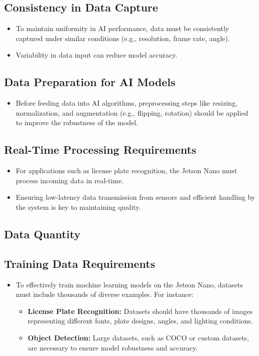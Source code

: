 \subsection*{Consistency in Data Capture}
\begin{itemize}[leftmargin=1.5cm]
	\item To maintain uniformity in AI performance, data must be consistently captured under similar conditions (e.g., resolution, frame rate, angle).
	\item Variability in data input can reduce model accuracy.
\end{itemize}

\subsection*{Data Preparation for AI Models}
\begin{itemize}[leftmargin=1.5cm]
	\item Before feeding data into AI algorithms, preprocessing steps like resizing, normalization, and augmentation (e.g., flipping, rotation) should be applied to improve the robustness of the model.
\end{itemize}

\subsection*{Real-Time Processing Requirements}
\begin{itemize}[leftmargin=1.5cm]
	\item For applications such as license plate recognition, the Jetson Nano must process incoming data in real-time.
	\item Ensuring low-latency data transmission from sensors and efficient handling by the system is key to maintaining quality. \cite{NVF:2024}
\end{itemize}

\subsection{Data Quantity}

\subsection*{Training Data Requirements}
\begin{itemize}[leftmargin=1.5cm]
	\item To effectively train machine learning models on the Jetson Nano, datasets must include thousands of diverse examples. For instance:
	\begin{itemize}
		\item \textbf{License Plate Recognition:} Datasets should have thousands of images representing different fonts, plate designs, angles, and lighting conditions.
		\item \textbf{Object Detection:} Large datasets, such as COCO or custom datasets, are necessary to ensure model robustness and accuracy.
	\end{itemize}
\end{itemize}

